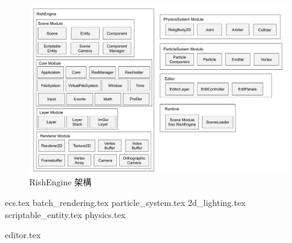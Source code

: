 \begin{figure}[h]
    \begin{center}
    \includegraphics[width=\textwidth]{./resources/RishEngine_arch.png}
    \end{center}
\caption{RishEngine 架構}
\label{fig:RishEngineArch}
\end{figure}


{ecs.tex}
{batch_rendering.tex}
{particle_system.tex}
{2d_lighting.tex}
{scriptable_entity.tex}
{physics.tex}

{editor.tex}

\newpage